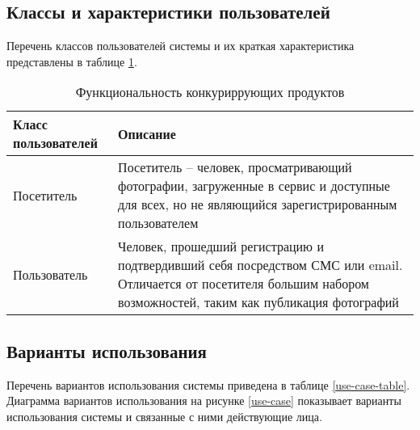 \subsection{Классы и характеристики пользователей}

Перечень классов пользователей системы и их краткая характеристика представлены в таблице \ref{user-classes-table}.
\begin{table}[H]
  \caption{Функциональность конкуриррующих продуктов}\label{user-classes-table}
  \begin{spacing}{1}
  \small
  \begin{tabular}{|p{5cm}|p{9cm}|}
  \hline Класс пользователей & Описание \\ 
  \hline Посетитель & Посетитель – человек, просматривающий фотографии, загруженные в сервис и доступные для всех, но не являющийся зарегистрированным пользователем \\ 
  \hline Пользователь & Человек, прошедший регистрацию и подтвердивший себя посредством СМС или email. Отличается от посетителя большим набором возможностей, таким как публикация фотографий \\ 
  \hline
  \end{tabular}
  \end{spacing}
\end{table}

\subsection{Варианты использования}
Перечень вариантов использования системы приведена в таблице \ref{use-case-table}.
Диаграмма вариантов использования на рисунке \ref{use-case} показывает варианты использования системы и связанные с ними действующие лица.

